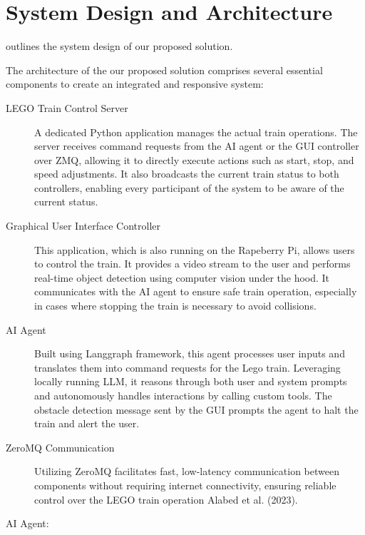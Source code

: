 \chapter{System Design and Architecture}
\label{ch:system_design}

outlines the system design of our proposed solution.

The architecture of the our proposed solution comprises several essential components to create an integrated and responsive system:

\begin{description}
    \item[LEGO Train Control Server] A dedicated Python application manages the actual train operations. The server receives command requests from the AI agent or the GUI controller over ZMQ, allowing it to directly execute actions such as start, stop, and speed adjustments. It also broadcasts the current train status to both controllers, enabling every participant of the system to be aware of the current status.
    
    \item[Graphical User Interface Controller] This application, which is also running on the Rapeberry Pi, allows users to control the train. It provides a video stream to the user and performs real-time object detection using computer vision under the hood. It communicates with the AI agent to ensure safe train operation, especially in cases where stopping the train is necessary to avoid collisions.
    
    \item[AI Agent] Built using Langgraph framework, this agent processes user inputs and translates them into command requests for the Lego train. Leveraging locally running LLM, it reasons through both user and system prompts and autonomously handles interactions by calling custom tools. The obstacle detection message sent by the GUI prompts the agent to halt the train and alert the user.
    
    \item[ZeroMQ Communication] Utilizing ZeroMQ facilitates fast, low-latency communication between components without requiring internet connectivity, ensuring reliable control over the LEGO train operation Alabed et al. (2023).
\end{description}


AI Agent: 

